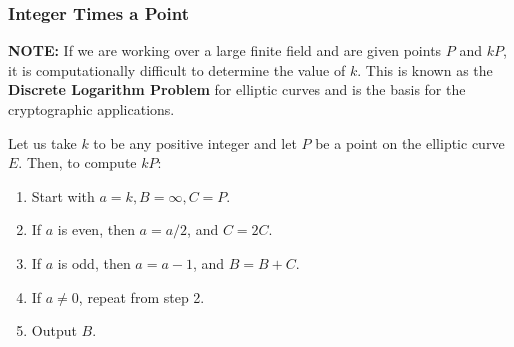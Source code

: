 \documentclass[a4paper, 12pt]{article}
\begin{document}
\subsubsection{Integer Times a Point}
\textbf{NOTE:} If we are working over a large finite field and are given points $P$ and $kP$, it is computationally difficult to determine the value of $k$. This is known as the \textbf{Discrete Logarithm Problem} for elliptic curves and is the basis for the cryptographic applications.\par
Let us take $k$ to be any positive integer and let $P$ be a point on the elliptic curve $E$. Then, to compute $kP$:\par
\begin{enumerate}
	\item Start with $a=k, B=\infty, C=P$.
	\item If $a$ is even, then $a=a/2$, and $C=2C$.
	\item If $a$ is odd, then $a=a-1$, and $B=B+C$.
	\item If $a \neq 0$, repeat from step 2.
	\item Output $B$.
\end{enumerate}
\par
\end{document}
